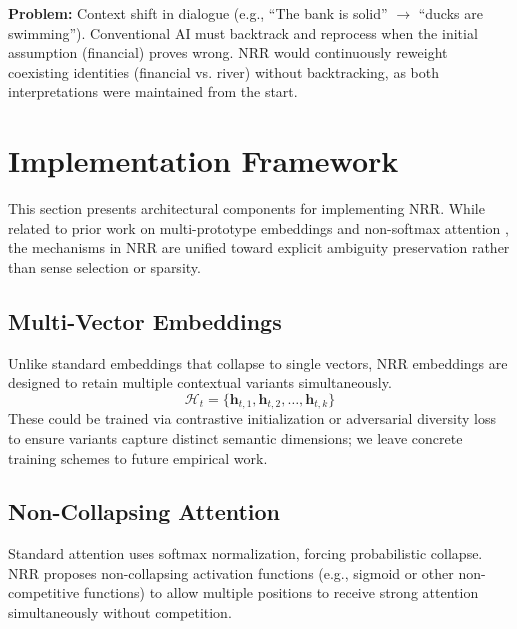 \documentclass[11pt,a4paper]{article}
\begin{document}
\textbf{Problem:} Context shift in dialogue (e.g., ``The bank is solid'' $\to$ ``ducks are swimming'').
Conventional AI must backtrack and reprocess when the initial assumption (financial) proves wrong.
NRR would continuously reweight coexisting identities (financial vs. river) without backtracking, as both interpretations were maintained from the start.

\section{Implementation Framework}
\label{sec:implementation}

This section presents architectural components for implementing NRR.
While related to prior work on multi-prototype embeddings \cite{reisinger2010multi, levine2020sensebert, loureiro2022lmms} and non-softmax attention \cite{katharopoulos2020transformers, choromanski2021rethinking}, the mechanisms in NRR are unified toward explicit ambiguity preservation rather than sense selection or sparsity.

\subsection{Multi-Vector Embeddings}

Unlike standard embeddings that collapse to single vectors, NRR embeddings are designed to retain multiple contextual variants simultaneously.
\begin{equation}
\mathcal{H}_t = \{\mathbf{h}_{t,1}, \mathbf{h}_{t,2}, \ldots, \mathbf{h}_{t,k}\}
\end{equation}
These could be trained via contrastive initialization or adversarial diversity loss to ensure variants capture distinct semantic dimensions; we leave concrete training schemes to future empirical work.

\subsection{Non-Collapsing Attention}

Standard attention uses softmax normalization, forcing probabilistic collapse.
NRR proposes non-collapsing activation functions (e.g., sigmoid or other non-competitive functions) to allow multiple positions to receive strong attention simultaneously without competition.
\end{document}
